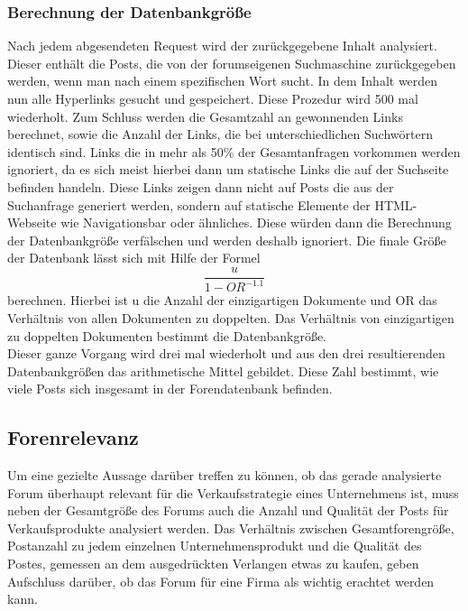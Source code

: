 \subsubsection{Berechnung der Datenbankgröße}
Nach jedem abgesendeten Request wird der zurückgegebene Inhalt analysiert. Dieser enthält die Posts, die von der 
forumseigenen Suchmaschine zurückgegeben werden, wenn man nach einem spezifischen Wort sucht. In dem Inhalt werden nun alle Hyperlinks gesucht und gespeichert. Diese Prozedur wird 500 mal wiederholt. Zum Schluss werden die Gesamtzahl an gewonnenden Links berechnet, sowie die Anzahl der Links, die bei unterschiedlichen Suchwörtern identisch sind. Links die in mehr als 50\% der Gesamtanfragen vorkommen werden ignoriert, da es sich meist hierbei dann um statische Links die auf der Suchseite befinden handeln. Diese Links zeigen dann nicht auf Posts die aus der Suchanfrage generiert werden, sondern auf statische Elemente der HTML-Webseite wie Navigationsbar oder ähnliches. Diese würden dann die Berechnung der Datenbankgröße verfälschen und werden deshalb ignoriert.
Die finale Größe der Datenbank lässt sich mit Hilfe der Formel \[\frac{u}{1-OR^{-1.1}}\] \cite{lu2008efficient} berechnen. Hierbei ist u die Anzahl der einzigartigen Dokumente und OR das Verhältnis von allen Dokumenten zu doppelten. Das Verhältnis von einzigartigen zu doppelten Dokumenten bestimmt die Datenbankgröße.\\
Dieser ganze Vorgang wird drei mal wiederholt und aus den drei resultierenden Datenbankgrößen das arithmetische Mittel gebildet. Diese Zahl bestimmt, wie viele Posts sich insgesamt in der Forendatenbank befinden.



\subsection{Forenrelevanz}
Um eine gezielte Aussage darüber treffen zu können, ob das gerade analysierte Forum überhaupt relevant für die Verkaufsstrategie eines Unternehmens ist, muss neben der Gesamtgröße des Forums auch die Anzahl und Qualität der Posts für Verkaufsprodukte analysiert werden. Das Verhältnis zwischen Gesamtforengröße, Postanzahl zu jedem einzelnen Unternehmensprodukt und die Qualität des Postes, gemessen an dem ausgedrückten Verlangen etwas zu kaufen, geben Aufschluss darüber, ob das Forum für eine Firma als wichtig erachtet werden kann.
